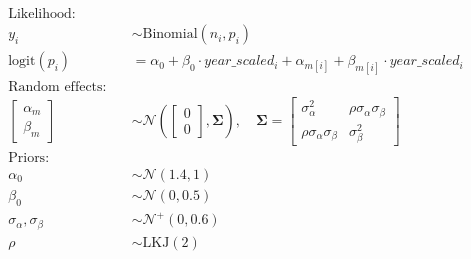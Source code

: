 \documentclass[12pt,a4paper]{article}
\begin{document}
\begin{align*}
  \text{Likelihood:} \quad     &                                                                                                           \\
  y_i                          & \sim \text{Binomial}(n_i, p_i)                                                                            \\
  \text{logit}(p_i)            & = \alpha_0 + \beta_0 \cdot year\_scaled_i + \alpha_{m[i]} + \beta_{m[i]} \cdot year\_scaled_i             \\[1em]
  \text{Random effects:} \quad &                                                                                                           \\
  \begin{bmatrix}
    \alpha_m \\
    \beta_m
  \end{bmatrix}             & \sim \mathcal{N}\left(
  \begin{bmatrix}
    0 \\
    0
  \end{bmatrix}, \boldsymbol{\Sigma}\right), \quad \boldsymbol{\Sigma} = \begin{bmatrix}
                                                                           \sigma_\alpha^2                 & \rho \sigma_\alpha \sigma_\beta \\
                                                                           \rho \sigma_\alpha \sigma_\beta & \sigma_\beta^2
                                                                         \end{bmatrix} \\[1em]
  \text{Priors:} \quad         &                                                                                                           \\
  \alpha_0                     & \sim \mathcal{N}(1.4, 1)                                                                                  \\
  \beta_0                      & \sim \mathcal{N}(0, 0.5)                                                                                  \\
  \sigma_\alpha, \sigma_\beta  & \sim \mathcal{N}^+(0, 0.6)                                                                                \\
  \rho                         & \sim \text{LKJ}(2)
\end{align*}
\end{document}
